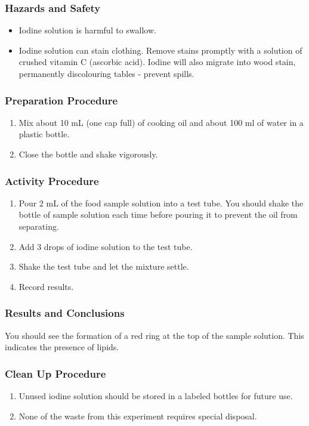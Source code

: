 \subsubsection*{Hazards and Safety}
\begin{itemize}
\item{Iodine solution is harmful to swallow.}
\item{Iodine solution can stain clothing. Remove stains promptly with a solution of crushed vitamin C (ascorbic acid). Iodine will also migrate into wood stain, permanently discolouring tables - prevent spills.}
\end{itemize}

\subsubsection*{Preparation Procedure}
\begin{enumerate}
\item{Mix about 10 mL (one cap full) of cooking oil and about 100 ml of water in a plastic bottle.}
\item{Close the bottle and shake vigorously.}
\end{enumerate}

\subsubsection*{Activity Procedure}
\begin{enumerate}
\item{Pour 2 mL of the food sample solution into a test tube. You should shake the bottle of sample solution each time before pouring it to prevent the oil from separating.}
\item{Add 3 drops of iodine solution to the test tube.}
\item{Shake the test tube and let the mixture settle.}
\item{Record results.}
\end{enumerate}

\subsubsection*{Results and Conclusions}
You should see the formation of a red ring at the top of the sample solution. This indicates the presence of lipids.

\subsubsection*{Clean Up Procedure}
\begin{enumerate}
\item{Unused iodine solution should be stored in a labeled bottles for future use.}
\item{None of the waste from this experiment requires special disposal.}
\end{enumerate}

